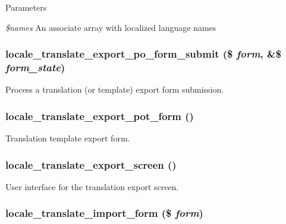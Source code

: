 \begin{DoxyParams}{Parameters}
\item[{\em \$names}]An associate array with localized language names \end{DoxyParams}
\hypertarget{group__locale_gaa8f71c53db9e03719bdeae8f594fb0ee}{
\subsubsection[{locale\_\-translate\_\-export\_\-po\_\-form\_\-submit}]{\setlength{\rightskip}{0pt plus 5cm}locale\_\-translate\_\-export\_\-po\_\-form\_\-submit (\$ {\em form}, \/  \&\$ {\em form\_\-state})}}
\label{group__locale_gaa8f71c53db9e03719bdeae8f594fb0ee}
Process a translation (or template) export form submission. \hypertarget{group__locale_ga670f0a541fc0b97da4bf4624c2afb434}{
\subsubsection[{locale\_\-translate\_\-export\_\-pot\_\-form}]{\setlength{\rightskip}{0pt plus 5cm}locale\_\-translate\_\-export\_\-pot\_\-form ()}}
\label{group__locale_ga670f0a541fc0b97da4bf4624c2afb434}
Translation template export form. \hypertarget{group__locale_gaa04044044d6c484553a41432db3924b4}{
\subsubsection[{locale\_\-translate\_\-export\_\-screen}]{\setlength{\rightskip}{0pt plus 5cm}locale\_\-translate\_\-export\_\-screen ()}}
\label{group__locale_gaa04044044d6c484553a41432db3924b4}
User interface for the translation export screen. \hypertarget{group__locale_gaceb2c6612ad9bc1472e4d3c71618c9b3}{
\subsubsection[{locale\_\-translate\_\-import\_\-form}]{\setlength{\rightskip}{0pt plus 5cm}locale\_\-translate\_\-import\_\-form (\$ {\em form})}}
